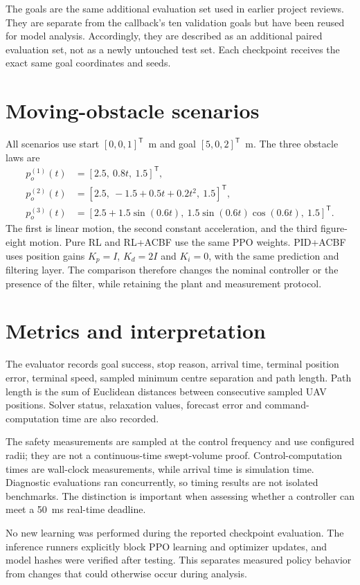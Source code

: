 The goals are the same additional evaluation set used in earlier project reviews. They are separate from the callback's ten validation goals but have been reused for model analysis. Accordingly, they are described as an additional paired evaluation set, not as a newly untouched test set. Each checkpoint receives the exact same goal coordinates and seeds.

\section{Moving-obstacle scenarios}
All scenarios use start $[0,0,1]^\mathsf{T}$~m and goal $[5,0,2]^\mathsf{T}$~m. The three obstacle laws are
\begin{align}
p_o^{(1)}(t)&=[2.5,\ 0.8t,\ 1.5]^\mathsf{T},\\
p_o^{(2)}(t)&=[2.5,\ -1.5+0.5t+0.2t^2,\ 1.5]^\mathsf{T},\\
p_o^{(3)}(t)&=[2.5+1.5\sin(0.6t),\ 1.5\sin(0.6t)\cos(0.6t),\ 1.5]^\mathsf{T}.
\end{align}
The first is linear motion, the second constant acceleration, and the third figure-eight motion. Pure RL and RL+ACBF use the same PPO weights. PID+ACBF uses position gains $K_p=I$, $K_d=2I$ and $K_i=0$, with the same prediction and filtering layer. The comparison therefore changes the nominal controller or the presence of the filter, while retaining the plant and measurement protocol.

\section{Metrics and interpretation}
The evaluator records goal success, stop reason, arrival time, terminal position error, terminal speed, sampled minimum centre separation and path length. Path length is the sum of Euclidean distances between consecutive sampled UAV positions. Solver status, relaxation values, forecast error and command-computation time are also recorded.

The safety measurements are sampled at the control frequency and use configured radii; they are not a continuous-time swept-volume proof. Control-computation times are wall-clock measurements, while arrival time is simulation time. Diagnostic evaluations ran concurrently, so timing results are not isolated benchmarks. The distinction is important when assessing whether a controller can meet a 50~ms real-time deadline.

No new learning was performed during the reported checkpoint evaluation. The inference runners explicitly block PPO learning and optimizer updates, and model hashes were verified after testing. This separates measured policy behavior from changes that could otherwise occur during analysis.
